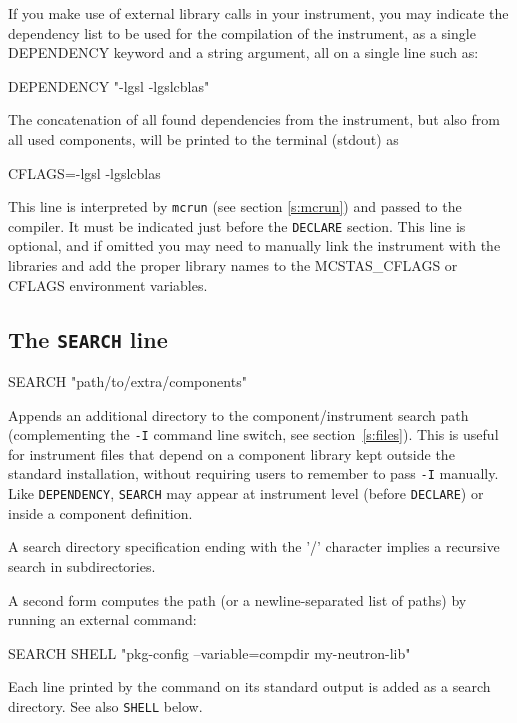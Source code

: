 If you make use of external library calls in your instrument, you may indicate 
the dependency list to be used for the compilation of the instrument, as a single 
DEPENDENCY keyword and a string argument, all on a single line such as:
\begin{mcstas}
DEPENDENCY "-lgsl -lgslcblas"
\end{mcstas}
The concatenation of all found dependencies from the instrument, but also from 
all used components, will be printed to the terminal (stdout) as
\begin{mcstas}
CFLAGS=-lgsl -lgslcblas
\end{mcstas}
This line is interpreted by \verb+mcrun+ (see section \ref{s:mcrun}) and passed 
to the compiler. It must be indicated just before the \texttt{DECLARE} section.
This line is optional, and if omitted you may need to manually link the instrument with the libraries and add the proper library names to the MCSTAS\_CFLAGS or CFLAGS environment variables.

\subsection{The \texttt{SEARCH} line}
\label{s:search}
\begin{mcstas}
SEARCH "path/to/extra/components"
\end{mcstas}
Appends an additional directory to the component/instrument search path
(complementing the \texttt{-I} command line switch, see section~\ref{s:files}).
This is useful for instrument files that depend on a component library kept
outside the standard \MCS installation, without requiring users to remember
to pass \texttt{-I} manually. Like \texttt{DEPENDENCY}, \texttt{SEARCH} may
appear at instrument level (before \texttt{DECLARE}) or inside a component
definition.

A search directory specification ending with the '/' character implies a recursive
search in subdirectories.

A second form computes the path (or a newline-separated list of paths) by
running an external command:
\begin{mcstas}
SEARCH SHELL "pkg-config --variable=compdir my-neutron-lib"
\end{mcstas}
Each line printed by the command on its standard output is added as a
search directory. See also \texttt{SHELL} below.

